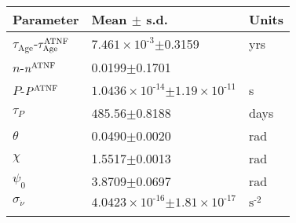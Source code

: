 \begin{tabular}{lll} \hhline{===}
        Parameter & Mean $\pm$ s.d. &  Units\\ \hline
$\tau_{\mathrm{Age}}$\textrm{-}$\tau_{\mathrm{Age}}^{\tiny\textrm{ATNF}}$
 & ${7.461}\times 10^{\textrm{-}3}$$\pm$0.3159 & yrs\\
$n$\textrm{-}$n^{\tiny\textrm{ATNF}}$ & 0.0199$\pm$0.1701 & \\
$P$\textrm{-}$P^{\tiny\textrm{ATNF}}$
 & ${1.0436}\times 10^{\textrm{-}14}$$\pm$${1.19}\times 10^{\textrm{-}11}$ & s\\
$\tau_{P}$ & $485.56$$\pm$0.8188 & days\\
$\theta$ & 0.0490$\pm$0.0020 & rad\\
$\chi$ & 1.5517$\pm$0.0013 & rad\\
$\psi_0$ & 3.8709$\pm$0.0697 & rad\\
$\sigma_{\dot{\nu}}$ & ${4.0423}\times 10^{\textrm{-}16}$$\pm$${1.81}\times 10^{\textrm{-}17}$ & $\mathrm{s}^{\textrm{-}2}$\\
\hhline{===}
\end{tabular}